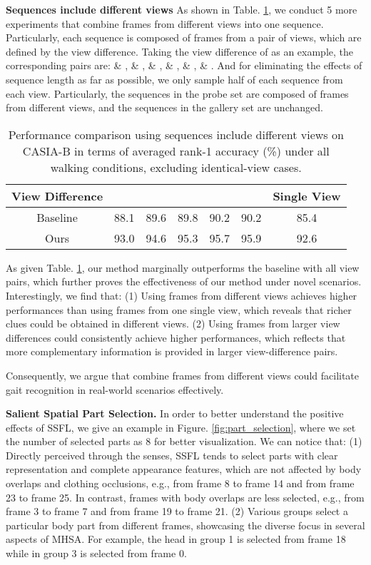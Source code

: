 \documentclass[journal]{IEEEtran}
\begin{document}
\noindent \textbf{Sequences include different views} As shown in Table. \ref{tab:multi_view}, we conduct 5 more experiments that combine frames from different views into one sequence. Particularly, each sequence is composed of frames from a pair of views, which are defined by the view difference. Taking the view difference of  as an example, the corresponding pairs are:  \& ,  \& ,  \& ,  \& ,  \& ,  \& . And for eliminating the effects of sequence length as far as possible, we only sample half of each sequence from each view. Particularly, the sequences in the probe set are composed of frames from different views, and the sequences in the gallery set are unchanged.

\begin{table}[ht]
    \centering
    \footnotesize
    \caption{Performance comparison using sequences include different views on CASIA-B in terms of averaged rank-1 accuracy (\%) under all walking conditions, excluding identical-view cases.}
    \begin{tabular}{|c|c|c|c|c|c|c|}
        \hline
        View Difference &  &  &  &  &  & Single View  \\\hline
        Baseline & 88.1 & 89.6 & 89.8 & 90.2 & 90.2 & 85.4 \\\hline
        Ours & 93.0 & 94.6 & 95.3 & 95.7 & 95.9 & 92.6 \\\hline
    \end{tabular}
    \label{tab:multi_view}
\end{table}

As given Table. \ref{tab:multi_view}, our method marginally outperforms the baseline with all view pairs, which further proves the effectiveness of our method under novel scenarios. Interestingly, we find that: (1) Using frames from different views achieves higher performances than using frames from one single view, which reveals that richer clues could be obtained in different views. (2) Using frames from larger view differences could consistently achieve higher performances, which reflects that more complementary information is provided in larger view-difference pairs. 

Consequently, we argue that combine frames from different views could facilitate gait recognition in real-world scenarios effectively.

\noindent \textbf{Salient Spatial Part Selection.} In order to better understand the positive effects of SSFL, we give an example in Figure. \ref{fig:part_selection}, where we set the number of selected parts as 8 for better visualization. We can notice that: (1) Directly perceived through the senses, SSFL tends to select parts with clear representation and complete appearance features, which are not affected by body overlaps and clothing occlusions, e.g., from frame 8 to frame 14 and from frame 23 to frame 25. In contrast, frames with body overlaps are less selected, e.g., from frame 3 to frame 7 and from frame 19 to frame 21. (2) Various groups select a particular body part from different frames, showcasing the diverse focus in several aspects of MHSA. For example, the head in group 1 is selected from frame 18 while in group 3 is selected from frame 0.
\end{document}
